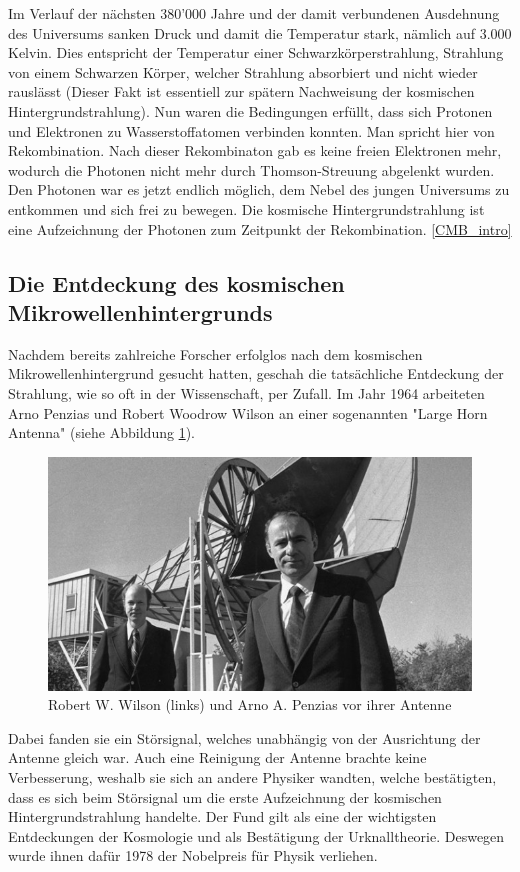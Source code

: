 Im Verlauf der nächsten 380'000 Jahre und der damit verbundenen Ausdehnung des 
Universums sanken Druck und damit die Temperatur stark, nämlich auf 3.000 
Kelvin.
Dies entspricht der Temperatur einer Schwarzkörperstrahlung, Strahlung von 
einem Schwarzen Körper, welcher Strahlung absorbiert und nicht wieder rauslässt 
(Dieser Fakt ist essentiell zur spätern Nachweisung der kosmischen 
Hintergrundstrahlung).
Nun waren die Bedingungen erfüllt, dass sich Protonen und Elektronen zu 
Wasserstoffatomen verbinden konnten.
Man spricht hier von Rekombination.
Nach dieser Rekombinaton gab es keine freien Elektronen mehr, wodurch die 
Photonen nicht mehr durch Thomson-Streuung abgelenkt wurden.
Den Photonen war es jetzt endlich möglich, dem Nebel des jungen Universums zu 
entkommen und sich frei zu bewegen.
Die kosmische Hintergrundstrahlung ist eine Aufzeichnung der Photonen zum 
Zeitpunkt der Rekombination.
\ref{CMB_intro}

\subsection{Die Entdeckung des kosmischen Mikrowellenhintergrunds}
Nachdem bereits zahlreiche Forscher erfolglos nach dem kosmischen 
Mikrowellenhintergrund gesucht hatten, geschah die tatsächliche Entdeckung der 
Strahlung, wie so oft in der Wissenschaft, per Zufall.
Im Jahr 1964 arbeiteten Arno Penzias und Robert Woodrow Wilson an einer 
sogenannten "Large Horn Antenna" (siehe Abbildung \ref{fig:wilson_penzias}).
\begin{figure}
	\includegraphics[width=\linewidth]{cmb/images/penzias-wilson-large-horn-antenna.jpg}
	\caption{Robert W. Wilson (links) und Arno A. Penzias vor ihrer Antenne}
	\label{fig:wilson_penzias}
\end{figure}
Dabei fanden sie ein Störsignal, welches unabhängig von der Ausrichtung der 
Antenne gleich war.
Auch eine Reinigung der Antenne brachte keine Verbesserung, weshalb sie sich an 
andere Physiker wandten, welche bestätigten, dass es sich beim Störsignal um 
die erste Aufzeichnung der kosmischen Hintergrundstrahlung handelte.
Der Fund gilt als eine der wichtigsten Entdeckungen der Kosmologie und als 
Bestätigung der Urknalltheorie.
Deswegen wurde ihnen dafür 1978 der Nobelpreis für Physik verliehen.

